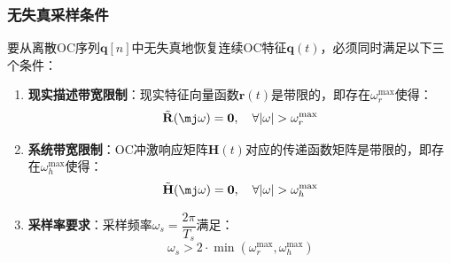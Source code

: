 \subsubsection{无失真采样条件}

\begin{theorem}[OC变换的无失真采样条件]
    要从离散OC序列$\mathbf{q}[n]$中无失真地恢复连续OC特征$\mathbf{q}(t)$，必须同时满足以下三个条件：

    \begin{enumerate}
        \item \textbf{现实描述带宽限制}：现实特征向量函数$\mathbf{r}(t)$是带限的，即存在$\omega_r^{\text{max}}$使得：
              \begin{equation}
                  \tilde{\mathbf{R}}(\mj\omega) = \mathbf{0}, \quad \forall |\omega| > \omega_r^{\text{max}}
              \end{equation}

        \item \textbf{系统带宽限制}：OC冲激响应矩阵$\mathbf{H}(t)$对应的传递函数矩阵是带限的，即存在$\omega_h^{\text{max}}$使得：
              \begin{equation}
                  \tilde{\mathbf{H}}(\mj\omega) = \mathbf{0}, \quad \forall |\omega| > \omega_h^{\text{max}}
              \end{equation}

        \item \textbf{采样率要求}：采样频率$\displaystyle\omega_s = \dfrac{2\pi}{T_s}$满足：
              \begin{equation}
                  \omega_s > 2 \cdot \min(\omega_r^{\text{max}}, \omega_h^{\text{max}})
                  \label{eq:nyquist-condition}
              \end{equation}
    \end{enumerate}
\end{theorem}


